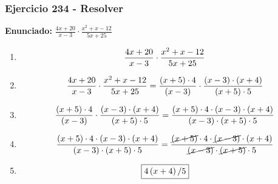\documentclass[11pt,a4paper]{article}
\newcommand{\fitmath}[1]{%
\[
\setbox0=\hbox{$\displaystyle #1$}%
\ifdim\wd0>\linewidth
\resizebox{\linewidth}{!}{$\displaystyle #1$}%
\else
#1%
\fi
\]
}
\begin{document}
\subsubsection*{Ejercicio 234 - Resolver}
\textbf{Enunciado:} $ \frac{4 x + 20}{x - 3} \cdot \frac{x^{2} + x - 12}{5 x + 25} $\par
\begin{enumerate}[leftmargin=2em]
\item \fitmath{\frac{4 x + 20}{x - 3} \cdot \frac{x^{2} + x - 12}{5 x + 25}}
\item \fitmath{\frac{4 x + 20}{x - 3} \cdot \frac{x^{2} + x - 12}{5 x + 25}= \frac{\left(x + 5\right)\cdot 4}{\left(x - 3\right)} \cdot \frac{\left(x - 3\right)\cdot \left(x + 4\right)}{\left(x + 5\right)\cdot 5}}
\item \fitmath{\frac{\left(x + 5\right)\cdot 4}{\left(x - 3\right)}\cdot \frac{\left(x - 3\right)\cdot \left(x + 4\right)}{\left(x + 5\right)\cdot 5}= \frac{\left(x + 5\right)\cdot 4\cdot \left(x - 3\right)\cdot \left(x + 4\right)}{\left(x - 3\right)\cdot \left(x + 5\right)\cdot 5}}
\item \fitmath{\frac{\left(x + 5\right)\cdot 4\cdot \left(x - 3\right)\cdot \left(x + 4\right)}{\left(x - 3\right)\cdot \left(x + 5\right)\cdot 5}= \frac{\cancel{\left(x + 5\right)}\cdot 4\cdot \cancel{\left(x - 3\right)}\cdot \left(x + 4\right)}{\cancel{\left(x - 3\right)}\cdot \cancel{\left(x + 5\right)}\cdot 5}}
\item \fitmath{\boxed{4 \left(x + 4\right) / 5}}
\end{enumerate}

\vspace{0.12cm}
\end{document}
